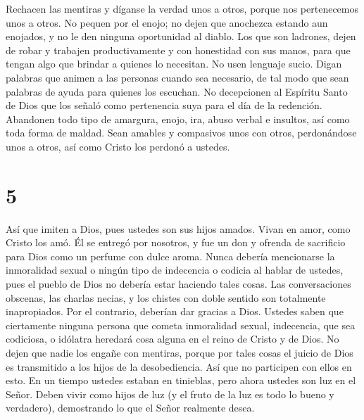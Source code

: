  Rechacen las mentiras y díganse la verdad unos a otros,
porque nos pertenecemos unos a otros.  No pequen por el
enojo; no dejen que anochezca estando aun enojados,  y no
le den ninguna oportunidad al diablo.  Los que son
ladrones, dejen de robar y trabajen productivamente y con honestidad con
sus manos, para que tengan algo que brindar a quienes lo necesitan.
 No usen lenguaje sucio. Digan palabras que animen a las
personas cuando sea necesario, de tal modo que sean palabras de ayuda
para quienes los escuchan.  No decepcionen al Espíritu
Santo de Dios que los señaló como pertenencia suya para el día de la
redención.  Abandonen todo tipo de amargura, enojo, ira,
abuso verbal e insultos, así como toda forma de maldad. 
Sean amables y compasivos unos con otros, perdonándose unos a otros, así
como Cristo los perdonó a ustedes.

\hypertarget{section-4}{%
\section{5}\label{section-4}}

 Así que imiten a Dios, pues ustedes son sus hijos amados.
 Vivan en amor, como Cristo los amó. Él se entregó por
nosotros, y fue un don y ofrenda de sacrificio para Dios como un perfume
con dulce aroma.  Nunca debería mencionarse la inmoralidad
sexual o ningún tipo de indecencia o codicia al hablar de ustedes, pues
el pueblo de Dios no debería estar haciendo tales cosas. 
Las conversaciones obscenas, las charlas necias, y los chistes con doble
sentido son totalmente inapropiados. Por el contrario, deberían dar
gracias a Dios.  Ustedes saben que ciertamente ninguna
persona que cometa inmoralidad sexual, indecencia, que sea codiciosa, o
idólatra heredará cosa alguna en el reino de Cristo y de Dios.
 No dejen que nadie los engañe con mentiras, porque por
tales cosas el juicio de Dios es transmitido a los hijos de la
desobediencia.  Así que no participen con ellos en esto.
 En un tiempo ustedes estaban en tinieblas, pero ahora
ustedes son luz en el Señor. Deben vivir como hijos de luz 
(y el fruto de la luz es todo lo bueno y verdadero), 
demostrando lo que el Señor realmente desea.

